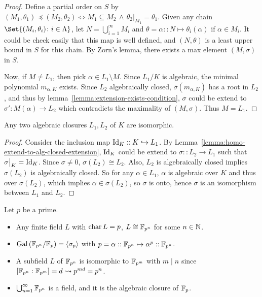 \begin{theorem}
\begin{lemma}
\begin{proof}
      Define a partial order on $S$ by $(M_1, \theta_1) \preceq (M_2, \theta_2)
      \iff M_1 \subseteq M_2 \,\land\, \theta_2 \big|_{M_1} = \theta_1$.
      Given any chain $\Set{(M_i, \theta_i) \colon i \in \Lambda }$, let
      $N = \bigcup_{i = 1}^\infty M_i$ and $\theta = \alpha :: N \mapsto \theta_i(\alpha)$
      if $\alpha \in M_i$. It could be check easily that this map is well defined,
      and $(N, \theta)$ is a least upper bound in $S$ for this chain.
      By Zorn's lemma, there exists a max element $(M, \sigma)$ in $S$.

      Now, if $M \neq L_1$, then pick $\alpha \in L_1 \setminus M$. Since $L_1/K$ is algebraic,
      the minimal polynomial $m_{\alpha, K}$ exists. Since $L_2$ algebraically closed, $\bar\sigma(m_{\alpha, K})$
      has a root in $L_2$, and thus by lemma~\ref{lemma:extension-exists-condition},
      $\sigma$ could be extend to $\sigma': M(\alpha) \to L_2$ which contradicts
      the maximality of $(M, \sigma)$. Thus $M = L_1$.
    \end{proof}
  \end{lemma}

  \begin{theorem}
    Any two algebraic closures $L_1, L_2$ of $K$ are isomorphic.
    \begin{proof}
      Consider the inclusion map ${\rm Id}_K :: K \hookrightarrow L_1$.
      By Lemma~\ref{lemma:homo-extend-to-alg-closed-extension},
      ${\rm Id}_K$ could be extend to $\sigma :: L_2 \to L_1$ such that $\sigma\big|_K = {\rm Id}_K$.
      Since $\sigma \neq 0$, $\sigma(L_2) \cong L_2$.
      Also, $L_2$ is algebraically closed implies $\sigma(L_2)$ is algebraically closed.
      So for any $\alpha \in L_1$, $\alpha$ is algebraic over $K$ and thus over $\sigma(L_2)$,
      which implies $\alpha \in \sigma(L_2)$, so $\sigma$ is onto, hence $\sigma$ is an
      isomorphism between $L_1$ and $L_2$.
    \end{proof}
  \end{theorem}

  \begin{example}
    Let $p$ be a prime.
    \begin{itemize}
      \item Any finite field $L$ with $\operatorname{char} L = p$, $L \cong \mathbb{F}_{p^n}$ for
        some $n \in \mathbb{N}$.
      \item $\operatorname{Gal}\left(\mathbb{F}_{p^n} / \mathbb{F}_p\right) = \langle\sigma_p\rangle$ with
        $p = \alpha :: \mathbb{F}_{p^n} \mapsto \alpha^p :: \mathbb{F}_{p^n}$.
      \item A subfield $L$ of $\mathbb{F}_{p^n}$ is isomorphic to $\mathbb{F}_{p^m}$ with
        $m \mid n$ since $[\mathbb{F}_{p^n} : \mathbb{F}_{p^m}] = d \leadsto p^{md} = p^n$.
      \item $\bigcup_{n=1}^\infty \mathbb{F}_{p^n}$ is a field, and it is the
        algebraic closure of $\mathbb{F}_p$.
    \end{itemize}
  \end{example}
\end{theorem}

